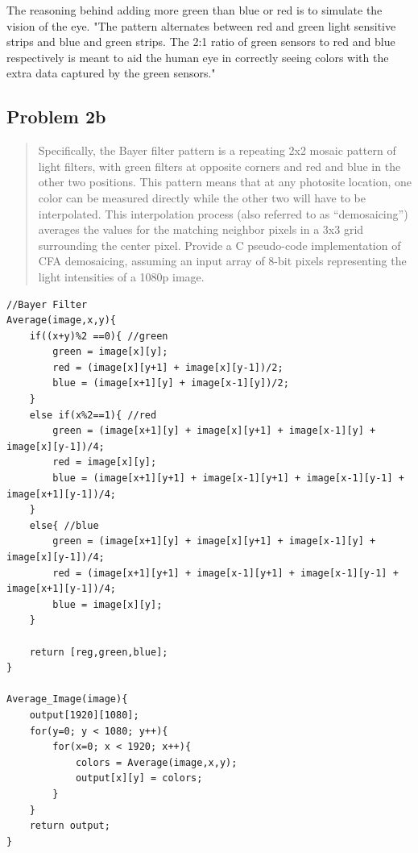 \documentclass[10pt,a4paper]{article}
\let\oldsubsection\subsection
\renewcommand{\subsection}{%
    \setcounter{equation}{0}%
    \oldsubsection%
}
\begin{document}
The reasoning behind adding more green than blue or red is to simulate the vision of the eye. "The pattern alternates between red and green light sensitive strips and blue and green strips. The 2:1 ratio of green sensors to red and blue respectively is meant to aid the human eye in correctly seeing colors with the extra data captured by the green sensors." \cite{Bayer Color}

\subsection{Problem 2b}
\begin{quote}
Specifically, the Bayer filter pattern is a repeating 2x2 mosaic pattern of light filters, with green filters at
opposite corners and red and blue in the other two positions. This pattern means that at any photosite location,
one color can be measured directly while the other two will have to be interpolated. This interpolation process
(also referred to as “demosaicing”) averages the values for the matching neighbor pixels in a 3x3 grid
surrounding the center pixel. Provide a C pseudo-code implementation of CFA demosaicing, assuming an input
array of 8-bit pixels representing the light intensities of a 1080p image.
\end{quote}

\begin{lstlisting}
//Bayer Filter
Average(image,x,y){
	if((x+y)%2 ==0){ //green
		green = image[x][y];
		red = (image[x][y+1] + image[x][y-1])/2;
		blue = (image[x+1][y] + image[x-1][y])/2;
	}
	else if(x%2==1){ //red
		green = (image[x+1][y] + image[x][y+1] + image[x-1][y] + image[x][y-1])/4;
		red = image[x][y];
		blue = (image[x+1][y+1] + image[x-1][y+1] + image[x-1][y-1] + image[x+1][y-1])/4;
	}
	else{ //blue
		green = (image[x+1][y] + image[x][y+1] + image[x-1][y] + image[x][y-1])/4;
		red = (image[x+1][y+1] + image[x-1][y+1] + image[x-1][y-1] + image[x+1][y-1])/4;
		blue = image[x][y];
	}
	
	return [reg,green,blue];
}

Average_Image(image){
	output[1920][1080];
	for(y=0; y < 1080; y++){
		for(x=0; x < 1920; x++){
			colors = Average(image,x,y);
			output[x][y] = colors;
		}
	}
	return output;
}

\end{lstlisting}
\end{document}
